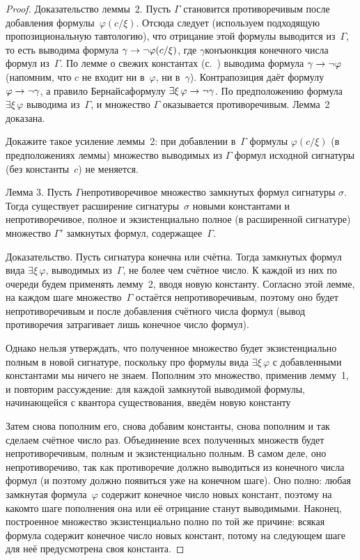 \begin{proof}
Доказательство леммы~2. Пусть $\Gamma$ становится противоречивым
после добавления формулы~$\varphi(c/\xi)$. Отсюда следует
(используем подходящую пропозициональную тавтологию),
 что отрицание
этой формулы выводится из~$\Gamma$, то есть выводима формула
$\gamma\hm\to\lnot\varphi(c/\xi)$, где $\gamma$\т конъюнкция
конечного числа формул из~$\Gamma$. По лемме о свежих константах
(с.~\pageref{lemma-fresh-constants}) выводима формула
$\gamma\hm\to\lnot\varphi$ (напомним, что $c$ не входит ни
в~$\varphi$, ни в~$\gamma$). Контрапозиция даёт формулу
$\varphi\hm\to\lnot\gamma$, а правило Бернайса\т формулу
$\exists\xi\,\varphi\hm\to\lnot\gamma$. По предположению формула
$\exists\xi\,\varphi$ выводима из~$\Gamma$, и множество $\Gamma$
оказывается противоречивым. Лемма~2 доказана.

\begin{problem}
Докажите такое усиление леммы~2: при добавлении в~$\Gamma$
формулы $\varphi(c/\xi)$ (в предположениях леммы) множество
выводимых из $\Gamma$ формул исходной сигнатуры (без константы~$c$)
не меняется.
\end{problem}

\textsf{Лемма 3}. Пусть $\Gamma$\т непротиворечивое множество
замкнутых формул сигнатуры $\sigma$. Тогда существует расширение
сигнатуры~$\sigma$ новыми константами и непротиворечивое,
полное и экзистенциально полное (в расширенной сигнатуре)
множество $\Gamma'$ замкнутых формул, содержащее~$\Gamma$.

Доказательство. Пусть сигнатура конечна или счётна. Тогда зам\-к\-ну\-тых
формул
вида $\exists\xi\,\varphi$, выводимых из~$\Gamma$, не более чем
счётное число. К каждой из них по очереди будем применять
лемму~2, вводя новую константу. Согласно этой лемме, на каждом
шаге множество~$\Gamma$ остаётся непротиворечивым, поэтому оно
будет непротиворечивым и после добавления счётного числа формул
(вывод противоречия затрагивает лишь конечное число формул).

Однако нельзя утверждать, что полученное множество будет
экзистенциально полным в новой сигнатуре, поскольку про формулы
вида $\exists\xi\,\varphi$ с добавленными константами мы ничего
не знаем. Пополним это множество, применив лемму~1, и повторим
рассуждение: для каждой замкнутой
выводимой формулы, начинающейся с
квантора существования, введём новую константу 

Затем снова пополним его, снова добавим константы, снова
пополним и так сделаем счётное число раз. Объединение всех
полученных множеств будет непротиворечивым, полным и
экзистенциально полным. В самом деле, оно непротиворечиво, так
как противоречие должно выводиться из конечного числа формул (и
поэтому должно появиться уже на конечном шаге). Оно полно: любая
замкнутая формула~$\varphi$ содержит конечное число новых
констант, поэтому на каком\д то шаге пополнения она или её
отрицание станут выводимыми. Наконец, построенное множество
экзистенциально полно по той же причине: всякая формула содержит
конечное число новых констант, потому на следующем шаге для неё
предусмотрена своя константа.


\end{proof}
